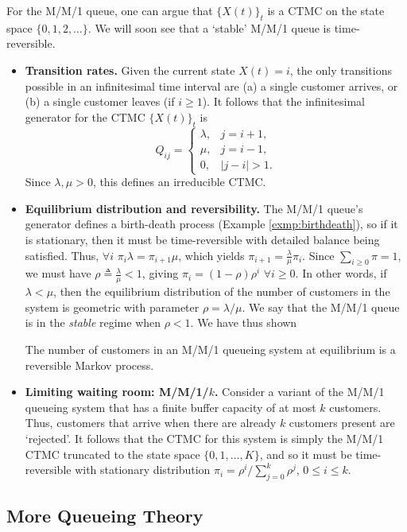 \documentclass[a4paper,10pt,english]{article}
\begin{document}
For the M/M/1 queue, one can argue that $\{X(t)\}_t$ is a CTMC on the state space $\{0, 1, 2, \ldots\}$. We will soon see that a `stable' M/M/1 queue is time-reversible.   
\begin{itemize}
\item
{\bf Transition rates.} Given the current state $X(t) = i$, the only transitions possible in an infinitesimal time interval are (a) a single customer arrives, or (b) a single customer leaves (if $i \geq 1$). It follows that the infinitesimal generator for the CTMC $\{X(t)\}_t$ is 
\[ Q_{ij} = \begin{cases}
\lambda, &j = i+1,\\
\mu, &j = i-1, \\
0, &|j-i| > 1. 
\end{cases}
\]
Since $\lambda, \mu > 0$, this defines an irreducible CTMC. 

\item {\bf Equilibrium distribution and reversibility.} The M/M/1 queue's generator defines a birth-death process (Example \ref{exmp:birthdeath}), so if it is stationary, then it must be time-reversible with detailed balance being satisfied. Thus, $\forall i$ $\pi_i \lambda = \pi_{i+1} \mu$, which yields $\pi_{i+1} = \frac{\lambda}{\mu} \pi_i$. Since $\sum_{i \geq 0} \pi = 1$, we must have $\rho \triangleq \frac{\lambda}{\mu} < 1$, giving $\pi_i = (1-\rho) \rho^i$ $\forall i \geq 0$. In other words, if $\lambda < \mu$, then the equilibrium distribution of the number of customers in the system is geometric with parameter $\rho = \lambda/\mu$. We say that the M/M/1 queue is in the {\em stable} regime when $\rho < 1$. We have thus shown 
\begin{cor} 
The number of customers in an M/M/1 queueing system at equilibrium is a reversible Markov process.
\end{cor}

\item
{\bf Limiting waiting room: M/M/1/$k$.} Consider a variant of the M/M/1 queueing system that has a finite buffer capacity of at most $k$ customers. Thus, customers that arrive when there are already $k$ customers present are `rejected'. It follows that the CTMC for this system is simply the M/M/1 CTMC truncated to the state space $\{0, 1, \ldots, K\}$, and so it must be time-reversible with stationary distribution $\pi_i = \rho^i / \sum_{j = 0}^k \rho^j$, $0 \leq i \leq k$. 
\end{itemize}


\subsection{More Queueing Theory}
\end{document}
